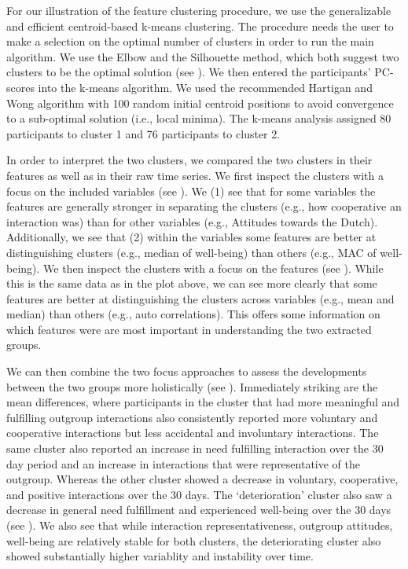For our illustration of the feature clustering procedure, we use the
generalizable and efficient centroid-based k-means clustering. The
procedure needs the user to make a selection on the optimal number of
clusters in order to run the main algorithm. We use the Elbow and the
Silhouette method, which both suggest two clusters to be the optimal
solution (see ). We then entered the participants'
PC-scores into the k-means algorithm. We used the recommended Hartigan
and Wong algorithm \citep{hartigan1979} with 100 random initial centroid
positions to avoid convergence to a sub-optimal solution (i.e., local
minima). The k-means analysis assigned 80 participants to cluster 1 and
76 participants to cluster 2.

In order to interpret the two clusters, we compared the two clusters in
their features as well as in their raw time series. We first inspect the
clusters with a focus on the included variables (see ).
We (1) see that for some variables the features are generally stronger
in separating the clusters (e.g., how cooperative an interaction was)
than for other variables (e.g., Attitudes towards the Dutch).
Additionally, we see that (2) within the variables some features are
better at distinguishing clusters (e.g., median of well-being) than
others (e.g., MAC of well-being). We then inspect the clusters with a
focus on the features (see ). While this is the same data
as in the plot above, we can see more clearly that some features are
better at distinguishing the clusters across variables (e.g., mean and
median) than others (e.g., auto correlations). This offers some
information on which features were are most important in understanding
the two extracted groups.

We can then combine the two focus approaches to assess the developments
between the two groups more holistically (see ).
Immediately striking are the mean differences, where participants in the
cluster that had more meaningful and fulfilling outgroup interactions
also consistently reported more voluntary and cooperative interactions
but less accidental and involuntary interactions. The same cluster also
reported an increase in need fulfilling interaction over the 30 day
period and an increase in interactions that were representative of the
outgroup. Whereas the other cluster showed a decrease in voluntary,
cooperative, and positive interactions over the 30 days. The
`deterioration' cluster also saw a decrease in general need fulfillment
and experienced well-being over the 30 days (see ). We
also see that while interaction representativeness, outgroup attitudes,
well-being are relatively stable for both clusters, the deteriorating
cluster also showed substantially higher variablity and instability over
time.

